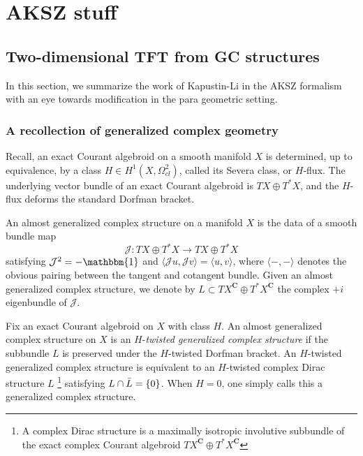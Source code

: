 \documentclass{article}
\newcommand{\JJ}{\mathcal{J}}
\newcommand{\Cc}{\mathbf{C}}
\newcommand{\id}{\mathbbm{1}}
\theoremstyle{definition}
\theoremstyle{definition}
\theoremstyle{remark}
\begin{document}
\section{AKSZ stuff}

\subsection{Two-dimensional TFT from GC structures}

In this section, we summarize the work of Kapustin-Li in the AKSZ formalism with an eye towards modification in the para geometric setting. 

\subsubsection{A recollection of generalized complex geometry}

Recall, an exact Courant algebroid on a smooth manifold $X$ is determined, up to equivalence, by a class $H \in H^1(X, \Omega^2_{cl})$, called its Severa class, or $H$-flux. 
The underlying vector bundle of an exact Courant algebroid is $TX \oplus T^*X$, and the $H$-flux deforms the standard Dorfman bracket. 

An almost generalized complex structure on a manifold $X$ is the data of a smooth bundle map
\[
\JJ : TX \oplus T^*X \to TX \oplus T^*X
\]
satisfying $\JJ^2 = - \id$ and $\langle\JJ u, \JJ v\rangle = \langle u,v\rangle$, where $\langle-,-\rangle$ denotes the obvious pairing between the tangent and cotangent bundle.
Given an almost generalized complex structure, we denote by $L \subset T X^{\Cc} \oplus T^* X^{\Cc}$ the complex $+i$ eigenbundle of $\JJ$. 

Fix an exact Courant algebroid on $X$ with class $H$. 
An almost generalized complex structure on $X$ is an $H$-{\em twisted generalized complex structure} if the subbundle $L$ is preserved under the $H$-twisted Dorfman bracket. 
An $H$-twisted generalized complex structure is equivalent to an $H$-twisted complex Dirac structure $L$ \footnote{A complex Dirac structure is a maximally isotropic involutive subbundle of the exact complex Courant algebroid $TX^{\Cc} \oplus T^*X^{\Cc}$} satisfying $L \cap \Bar{L} = \{0\}$. 
When $H = 0$, one simply calls this a generalized complex structure. 
\end{document}
